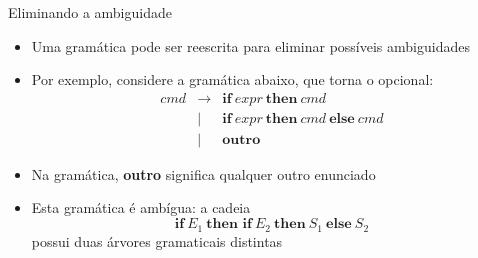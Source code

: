 \begin{frame}[fragile]{Eliminando a ambiguidade}

    \begin{itemize}
        \item Uma gramática pode ser reescrita para eliminar possíveis ambiguidades

        \item Por exemplo, considere a gramática abaixo, que torna o  opcional:
        \[
            \begin{array}{rcl}
                cmd & \to & \textbf{if}\ expr\ \textbf{then}\ cmd \\
                & | & \textbf{if}\ expr\ \textbf{then}\ cmd\ \textbf{else}\ cmd \\
                & | & \textbf{outro}
            \end{array}
        \]

        \item Na gramática, \textbf{outro} significa qualquer outro enunciado

        \item Esta gramática é ambígua: a cadeia
        \[
            \textbf{if}\ E_1\ \textbf{then if}\ E_2\ \textbf{then}\ S_1\ \textbf{else}\ S_2
        \]
        possui duas árvores gramaticais distintas
    \end{itemize}

\end{frame}

